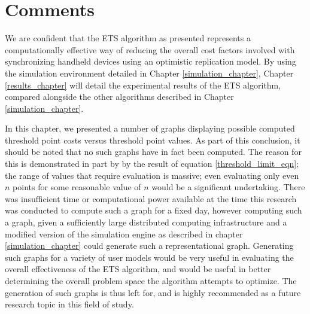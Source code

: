 \section{Comments}

We are confident that the ETS algorithm as presented represents a computationally effective way of reducing the overall cost factors involved with synchronizing handheld devices using an optimistic replication model.  By using the simulation environment detailed in Chapter \ref{simulation_chapter}, Chapter \ref{results_chapter} will detail the experimental results of the ETS algorithm, compared alongside the other algorithms described in Chapter \ref{simulation_chapter}.

In this chapter, we presented a number of graphs displaying possible computed threshold point costs versus threshold point values.  As part of this conclusion, it should be noted that no such graphs have in fact been computed.  The reason for this is demonstrated in part by by the result of equation \ref{threshold_limit_eqn}; the range of values that require evaluation is massive; even evaluating only even $n$ points for some reasonable value of $n$ would be a significant undertaking.  There was insufficient time or computational power available at the time this research was conducted to compute such a graph for a fixed day, however computing such a graph, given a sufficiently large distributed computing infrastructure and a modified version of the simulation engine as described in chapter \ref{simulation_chapter} could generate such a representational graph.  Generating such graphs for a variety of user models would be very useful in evaluating the overall effectiveness of the ETS algorithm, and would be useful in better determining the overall problem space the algorithm attempts to optimize.  The generation of such graphs is thus left for, and is highly recommended as a future research topic in this field of study.
